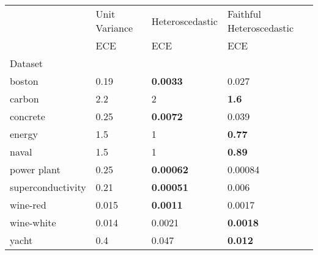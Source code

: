\begin{tabular}{l|l|l|l}
\toprule
 & Unit Variance & Heteroscedastic & Faithful Heteroscedastic \\
 & ECE & ECE & ECE \\
Dataset &  &  &  \\
\midrule
boston & 0.19 & \bfseries 0.0033 & 0.027 \\
carbon & 2.2 & 2 & \bfseries 1.6 \\
concrete & 0.25 & \bfseries 0.0072 & 0.039 \\
energy & 1.5 & 1 & \bfseries 0.77 \\
naval & 1.5 & 1 & \bfseries 0.89 \\
power plant & 0.25 & \bfseries 0.00062 & 0.00084 \\
superconductivity & 0.21 & \bfseries 0.00051 & 0.006 \\
wine-red & 0.015 & \bfseries 0.0011 & 0.0017 \\
wine-white & 0.014 & 0.0021 & \bfseries 0.0018 \\
yacht & 0.4 & 0.047 & \bfseries 0.012 \\
\bottomrule
\end{tabular}
